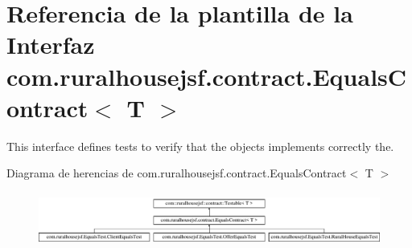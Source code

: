 \hypertarget{interfacecom_1_1ruralhousejsf_1_1contract_1_1_equals_contract}{}\section{Referencia de la plantilla de la Interfaz com.\+ruralhousejsf.\+contract.\+Equals\+Contract$<$ T $>$}
\label{interfacecom_1_1ruralhousejsf_1_1contract_1_1_equals_contract}


This interface defines tests to verify that the objects implements correctly the.  


Diagrama de herencias de com.\+ruralhousejsf.\+contract.\+Equals\+Contract$<$ T $>$\begin{figure}[H]
\begin{center}
\leavevmode
\includegraphics[height=1.777778cm]{d7/d3c/interfacecom_1_1ruralhousejsf_1_1contract_1_1_equals_contract}
\end{center}
\end{figure}
